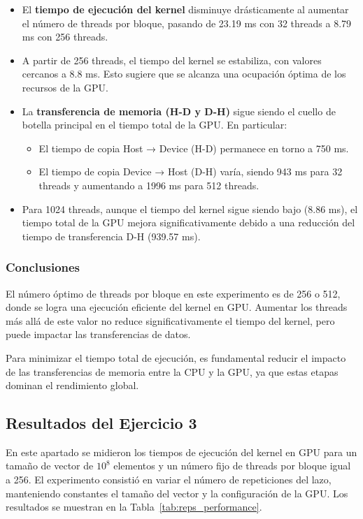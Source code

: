 \documentclass[twocolumn,a4paper,12pt]{article}
\begin{document}
\begin{itemize}
    \item El \textbf{tiempo de ejecución del kernel} disminuye drásticamente al aumentar el número de threads por bloque, pasando de 23.19 ms con 32 threads a 8.79 ms con 256 threads.
    \item A partir de 256 threads, el tiempo del kernel se estabiliza, con valores cercanos a 8.8 ms. Esto sugiere que se alcanza una ocupación óptima de los recursos de la GPU.
    \item La \textbf{transferencia de memoria (H-D y D-H)} sigue siendo el cuello de botella principal en el tiempo total de la GPU. En particular:
    \begin{itemize}
        \item El tiempo de copia Host → Device (H-D) permanece en torno a 750 ms.
        \item El tiempo de copia Device → Host (D-H) varía, siendo 943 ms para 32 threads y aumentando a 1996 ms para 512 threads.
    \end{itemize}
    \item Para 1024 threads, aunque el tiempo del kernel sigue siendo bajo (8.86 ms), el tiempo total de la GPU mejora significativamente debido a una reducción del tiempo de transferencia D-H (939.57 ms).
\end{itemize}

\subsubsection{Conclusiones}

El número óptimo de threads por bloque en este experimento es de 256 o 512, donde se logra una ejecución eficiente del kernel en GPU. Aumentar los threads más allá de este valor no reduce significativamente el tiempo del kernel, pero puede impactar las transferencias de datos.

Para minimizar el tiempo total de ejecución, es fundamental reducir el impacto de las transferencias de memoria entre la CPU y la GPU, ya que estas etapas dominan el rendimiento global.

\subsection{Resultados del Ejercicio 3}

En este apartado se midieron los tiempos de ejecución del kernel en GPU para un tamaño de vector de $10^8$ elementos y un número fijo de threads por bloque igual a 256. El experimento consistió en variar el número de repeticiones del lazo, manteniendo constantes el tamaño del vector y la configuración de la GPU. Los resultados se muestran en la Tabla~\ref{tab:reps_performance}.
\end{document}
